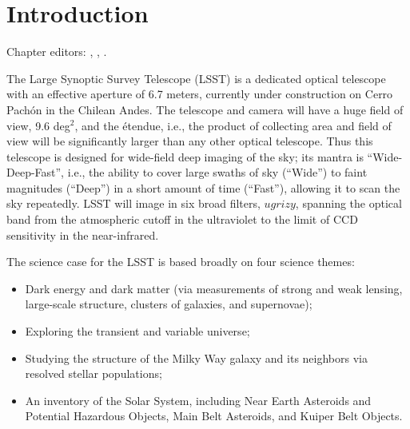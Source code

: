 \chapter[Introduction]{Introduction}
\def\chpname{intro}\label{chp:\chpname}

Chapter editors:
,
,
.

The Large Synoptic Survey Telescope (LSST) is a dedicated optical
telescope with an effective aperture of 6.7 meters, currently under
construction on Cerro Pach\'on in the Chilean Andes.  The telescope
and camera will have a huge field of view, 9.6 deg$^2$, and the
\'etendue, i.e., the product of collecting area and field of view will
be significantly larger than any other optical telescope.  Thus this telescope
is designed for wide-field deep imaging of the sky; its mantra is
``Wide-Deep-Fast'', i.e., the ability to cover large swaths of sky
(``Wide'') to faint magnitudes (``Deep'') in a short amount of time
(``Fast''), allowing it to scan the sky repeatedly.  LSST will image
in six broad filters, $ugrizy$, spanning the optical band from the
atmospheric cutoff in the ultraviolet to the limit of CCD sensitivity
in the near-infrared.  

  The science case for the LSST is based broadly on four science
  themes:
\begin{itemize}
\item Dark energy and dark matter (via measurements of strong and weak lensing,
  large-scale structure, clusters of galaxies, and supernovae);
\item Exploring the transient and variable universe;
\item Studying the structure of the Milky Way galaxy and its neighbors
  via resolved stellar populations;
\item An inventory of the Solar System, including Near Earth Asteroids
  and Potential Hazardous Objects, Main Belt Asteroids, and
  Kuiper Belt Objects.
\end{itemize}

